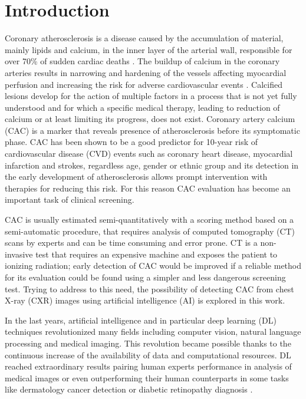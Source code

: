 \chapter{Introduction}

Coronary atherosclerosis is a disease caused by the accumulation of material, mainly lipids and calcium, in the inner layer of the arterial wall, responsible for over 70\% of sudden cardiac deaths \cite{Czaja-Ziolkowska2022-pd}.
The buildup of calcium in the coronary arteries results in narrowing and hardening of the vessels affecting myocardial perfusion and increasing the risk for adverse cardiovascular events \cite{liu2015current}.
Calcified lesions develop for the action of multiple factors in a process that is not yet fully understood and for which a specific medical therapy, leading to reduction of calcium or at least limiting its progress, does not exist.
Coronary artery calcium (CAC) is a marker that reveals presence of atherosclerosis before its symptomatic phase.
CAC has been shown to be a good predictor for 10-year risk of cardiovascular disease (CVD) events such as coronary heart disease, myocardial infarction and strokes, regardless age, gender or ethnic group \cite{Budoff2018-uo} and its detection in the early development of atherosclerosis allows prompt intervention with therapies for reducing this risk.
For this reason CAC evaluation has become an important task of clinical screening.

CAC is usually estimated semi-quantitatively with a scoring method based on a semi-automatic procedure, that requires analysis of computed tomography (CT) scans by experts and can be time consuming and error prone.
CT is a non-invasive test that requires an expensive machine and exposes the patient to ionizing radiation; early detection of CAC would be improved if a reliable method for its evaluation could be found using a simpler and less dangerous screening test.
Trying to address to this need, the possibility of detecting CAC from chest X-ray (CXR) images using artificial intelligence (AI) is explored in this work.

In the last years, artificial intelligence and in particular deep learning (DL) techniques revolutionized many fields including computer vision, natural language processing and medical imaging.
This revolution became possible thanks to the continuous increase of the availability of data and  computational resources.
DL reached extraordinary results pairing human experts performance in analysis of medical images or even outperforming their human counterparts \cite{litjens2017survey} in some tasks like dermatology cancer detection \cite{esteva2017dermatologist} or diabetic retinopathy diagnosis \cite{gulshan2016development}.

